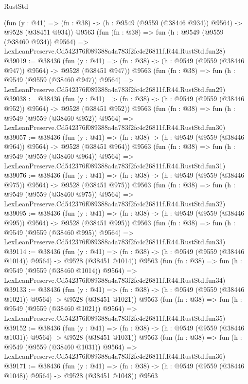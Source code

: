 \begin{lexlean}{RustStd}
\begin{coremodule}
    (fun (y : @41) => (fn : @38) -> (h : @9549 (@9559 (@38446 @934)) @9564) -> @9528 (@38451 @934))
    @9563
    (fun (fn : @38) =>
    fun (h : @9549 (@9559 (@38460 @934)) @9564) =>
    LexLeanPreserve.Cd542376f089388a4a783f2fc4c26811f.R44.RustStd.fun28)
@39019 := @38436
    (fun (y : @41) => (fn : @38) -> (h : @9549 (@9559 (@38446 @947)) @9564) -> @9528 (@38451 @947))
    @9563
    (fun (fn : @38) =>
    fun (h : @9549 (@9559 (@38460 @947)) @9564) =>
    LexLeanPreserve.Cd542376f089388a4a783f2fc4c26811f.R44.RustStd.fun29)
@39038 := @38436
    (fun (y : @41) => (fn : @38) -> (h : @9549 (@9559 (@38446 @952)) @9564) -> @9528 (@38451 @952))
    @9563
    (fun (fn : @38) =>
    fun (h : @9549 (@9559 (@38460 @952)) @9564) =>
    LexLeanPreserve.Cd542376f089388a4a783f2fc4c26811f.R44.RustStd.fun30)
@39057 := @38436
    (fun (y : @41) => (fn : @38) -> (h : @9549 (@9559 (@38446 @964)) @9564) -> @9528 (@38451 @964))
    @9563
    (fun (fn : @38) =>
    fun (h : @9549 (@9559 (@38460 @964)) @9564) =>
    LexLeanPreserve.Cd542376f089388a4a783f2fc4c26811f.R44.RustStd.fun31)
@39076 := @38436
    (fun (y : @41) => (fn : @38) -> (h : @9549 (@9559 (@38446 @975)) @9564) -> @9528 (@38451 @975))
    @9563
    (fun (fn : @38) =>
    fun (h : @9549 (@9559 (@38460 @975)) @9564) =>
    LexLeanPreserve.Cd542376f089388a4a783f2fc4c26811f.R44.RustStd.fun32)
@39095 := @38436
    (fun (y : @41) => (fn : @38) -> (h : @9549 (@9559 (@38446 @995)) @9564) -> @9528 (@38451 @995))
    @9563
    (fun (fn : @38) =>
    fun (h : @9549 (@9559 (@38460 @995)) @9564) =>
    LexLeanPreserve.Cd542376f089388a4a783f2fc4c26811f.R44.RustStd.fun33)
@39114 := @38436
    (fun (y : @41) =>
    (fn : @38) -> (h : @9549 (@9559 (@38446 @1014)) @9564) -> @9528 (@38451 @1014))
    @9563
    (fun (fn : @38) =>
    fun (h : @9549 (@9559 (@38460 @1014)) @9564) =>
    LexLeanPreserve.Cd542376f089388a4a783f2fc4c26811f.R44.RustStd.fun34)
@39133 := @38436
    (fun (y : @41) =>
    (fn : @38) -> (h : @9549 (@9559 (@38446 @1021)) @9564) -> @9528 (@38451 @1021))
    @9563
    (fun (fn : @38) =>
    fun (h : @9549 (@9559 (@38460 @1021)) @9564) =>
    LexLeanPreserve.Cd542376f089388a4a783f2fc4c26811f.R44.RustStd.fun35)
@39152 := @38436
    (fun (y : @41) =>
    (fn : @38) -> (h : @9549 (@9559 (@38446 @1031)) @9564) -> @9528 (@38451 @1031))
    @9563
    (fun (fn : @38) =>
    fun (h : @9549 (@9559 (@38460 @1031)) @9564) =>
    LexLeanPreserve.Cd542376f089388a4a783f2fc4c26811f.R44.RustStd.fun36)
@39171 := @38436
    (fun (y : @41) =>
    (fn : @38) -> (h : @9549 (@9559 (@38446 @1048)) @9564) -> @9528 (@38451 @1048))
    @9563

\end{coremodule}
\end{lexlean}
